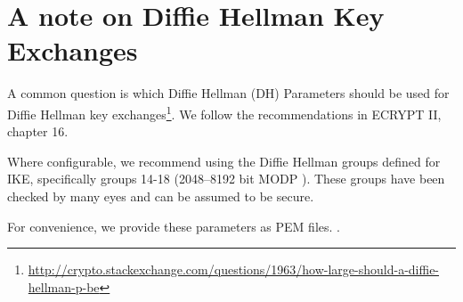 \section{A note on Diffie Hellman Key Exchanges}
\label{section:DH}

A common question is which Diffie Hellman (DH) Parameters  should be used for Diffie Hellman key exchanges\footnote{\url{http://crypto.stackexchange.com/questions/1963/how-large-should-a-diffie-hellman-p-be}}. We follow the recommendations in ECRYPT II, chapter 16.\cite{ii2011ecrypt}

Where configurable, we recommend using the Diffie Hellman groups
defined for IKE, specifically groups 14-18 (2048--8192 bit MODP \cite{rfc3526}).
These groups have been checked by many eyes and can be assumed to be secure.

For convenience, we provide these parameters as PEM files. .
